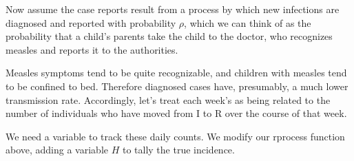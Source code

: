 \documentclass{beamer}\usepackage[]{graphicx}\usepackage[]{color}
\begin{document}
\begin{frame}[fragile]

\bi

\item Now assume the case reports result from a process by which new infections are diagnosed and reported with probability $\rho$, which we can think of as the probability that a child's parents take the child to the doctor, who recognizes measles and reports it to the authorities.

\item Measles symptoms tend to be quite recognizable, and children with measles tend to be confined to bed. Therefore diagnosed cases have, presumably, a much lower transmission rate.
Accordingly, let's treat each week's  as being related to the number of individuals who have moved from I to R over the course of that week.

\item We need a variable to track these daily counts.
We modify our rprocess function above, adding a variable $H$ to tally the true incidence.

\ei

\end{frame}
\end{document}
